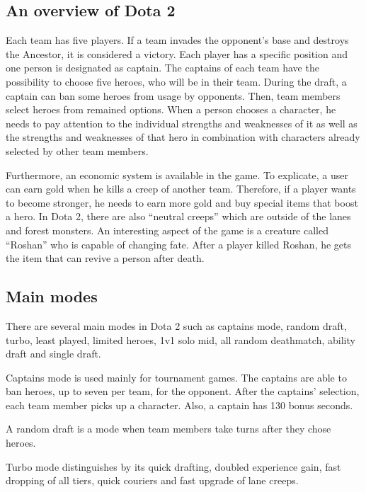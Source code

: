 \documentclass[10pt,twoside,slovak,a4paper]{article}
\begin{document}
\subsection{An overview of Dota 2} \label{overview}


Each team has five players. If a team invades the opponent’s base and destroys the Ancestor, it is considered a victory. Each player has a specific position and one person is designated as captain. The captains of each team have the possibility to choose five heroes, who will be in their team. During the draft, a captain can ban some heroes from usage by opponents. Then, team members select heroes from remained options. When a person chooses a character, he needs to pay attention to the individual strengths and weaknesses of it as well as the strengths and weaknesses of that hero in combination with characters already selected by other team members\cite{Conley:Dota}. 

Furthermore, an economic system is available in the game. To explicate, a user can earn gold when he kills a creep of another team. Therefore, if a player wants to become stronger, he needs to earn more gold and buy special items that boost a hero.
In Dota 2, there are also “neutral creeps” which are outside of the lanes and forest monsters. An interesting aspect of the game is a creature called “Roshan” who is capable of changing fate. After a player killed Roshan, he gets the item that can revive a person after death.



\subsection{Main modes} \label{main modes}

There are several main modes in Dota 2 such as captains mode, random draft, turbo, least played, limited heroes, 1v1 solo mid, all random deathmatch, ability draft and single draft\cite{ Modes:Nathan}.  

Captains mode is used mainly for tournament games. The captains are able to ban heroes, up to seven per team, for the opponent. After the captains’ selection, each team member picks up a character. Also, a captain has 130 bonus seconds. 

A random draft is a mode when team members take turns after they chose heroes.

Turbo mode distinguishes by its quick drafting, doubled experience gain, fast dropping of all tiers, quick couriers and fast upgrade of lane creeps.
\end{document}
